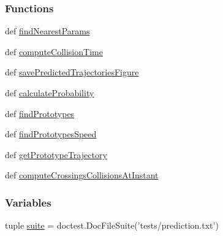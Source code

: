 \subsubsection*{Functions}
\begin{DoxyCompactItemize}
\item 
def \hyperlink{namespaceprediction_a79b51b3fe6836e86dd2003956df1fb12}{find\-Nearest\-Params}
\item 
def \hyperlink{namespaceprediction_a4a03f8ba0ccc356bbacc5730ccc046a9}{compute\-Collision\-Time}
\item 
def \hyperlink{namespaceprediction_a6815a08f4d08957ed2edf0243bf00ba3}{save\-Predicted\-Trajectories\-Figure}
\item 
def \hyperlink{namespaceprediction_a88779c63bc7204168f1c7d195f91ddf7}{calculate\-Probability}
\item 
def \hyperlink{namespaceprediction_a719536d9be9ff01679ed72d85303c3a1}{find\-Prototypes}
\item 
def \hyperlink{namespaceprediction_a90d8288ab54e45df8b4fa0c0d209b5b3}{find\-Prototypes\-Speed}
\item 
def \hyperlink{namespaceprediction_ad63641503762f30fce696fa8e7681f28}{get\-Prototype\-Trajectory}
\item 
def \hyperlink{namespaceprediction_a442be0c89f0498c306588aadc4f22880}{compute\-Crossings\-Collisions\-At\-Instant}
\end{DoxyCompactItemize}
\subsubsection*{Variables}
\begin{DoxyCompactItemize}
\item 
tuple \hyperlink{namespaceprediction_aeaf552318c37578eb6753c31c046d446}{suite} = doctest.\-Doc\-File\-Suite('tests/prediction.\-txt')
\end{DoxyCompactItemize}


